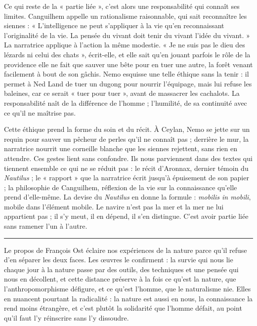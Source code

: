 \documentclass[11pt,a4paper]{article}
\begin{document}
Ce qui reste de la « partie liée », c'est alors une responsabilité qui connaît ses limites. Canguilhem appelle un rationalisme raisonnable, qui sait reconnaître les siennes : « L'intelligence ne peut s'appliquer à la vie qu'en reconnaissant l'originalité de la vie. La pensée du vivant doit tenir du vivant l'idée du vivant. » La narratrice applique à l'action la même modestie. « Je ne suis pas le dieu des lézards ni celui des chats », écrit-elle, et elle sait qu'en jouant parfois le rôle de la providence elle ne fait que sauver une bête pour en tuer une autre, la forêt venant facilement à bout de son gâchis. Nemo esquisse une telle éthique sans la tenir : il permet à Ned Land de tuer un dugong pour nourrir l'équipage, mais lui refuse les baleines, car ce serait « tuer pour tuer », avant de massacrer les cachalots. La responsabilité naît de la différence de l'homme ; l'humilité, de sa continuité avec ce qu'il ne maîtrise pas.

Cette éthique prend la forme du soin et du récit. À Ceylan, Nemo se jette sur un requin pour sauver un pêcheur de perles qu'il ne connaît pas ; derrière le mur, la narratrice nourrit une corneille blanche que les siennes rejettent, sans rien en attendre. Ces gestes lient sans confondre. Ils nous parviennent dans des textes qui tiennent ensemble ce qui ne se réduit pas : le récit d'Aronnax, dernier témoin du \emph{Nautilus} ; le « rapport » que la narratrice écrit jusqu'à épuisement de son papier ; la philosophie de Canguilhem, réflexion de la vie sur la connaissance qu'elle prend d'elle-même. La devise du \emph{Nautilus} en donne la formule : \emph{mobilis in mobili}, mobile dans l'élément mobile. Le navire n'est pas la mer et la mer ne lui appartient pas ; il s'y meut, il en dépend, il s'en distingue. C'est avoir partie liée sans ramener l'un à l'autre.

\begin{center}\rule{0.5\linewidth}{0.5pt}\end{center}

Le propos de François Ost éclaire nos expériences de la nature parce qu'il refuse d'en séparer les deux faces. Les œuvres le confirment : la survie qui nous lie chaque jour à la nature passe par des outils, des techniques et une pensée qui nous en décollent, et cette distance préserve à la fois ce qu'est la nature, que l'anthropomorphisme défigure, et ce qu'est l'homme, que le naturalisme nie. Elles en nuancent pourtant la radicalité : la nature est aussi en nous, la connaissance la rend moins étrangère, et c'est plutôt la solidarité que l'homme défait, au point qu'il faut l'y réinscrire sans l'y dissoudre.
\end{document}
